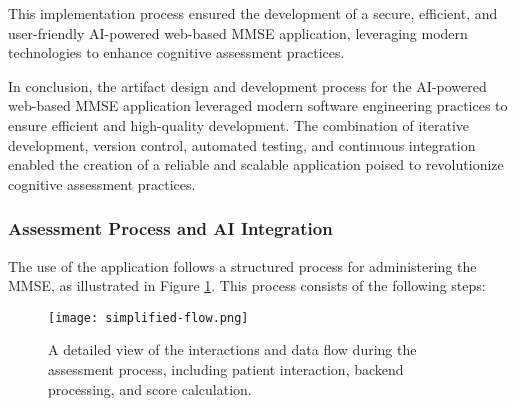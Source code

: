 This implementation process ensured the development of a secure, efficient, and user-friendly AI-powered web-based MMSE application, leveraging modern technologies to enhance cognitive assessment practices.

In conclusion, the artifact design and development process for the AI-powered web-based MMSE application leveraged modern software engineering practices to ensure efficient and high-quality development. The combination of iterative development, version control, automated testing, and continuous integration enabled the creation of a reliable and scalable application poised to revolutionize cognitive assessment practices.

\subsubsection{Assessment Process and AI Integration}

The use of the application follows a structured process for administering the MMSE, as illustrated in Figure \ref{fig:assessment-flow}. This process consists of the following steps:


\begin{figure}[h!]
\begin{center}
\texttt{[image: simplified-flow.png]}
\caption{A detailed view of the interactions and data flow during the assessment process, including patient interaction, backend processing, and score calculation.}
\label{fig:assessment-flow}
\end{center}
\end{figure}

